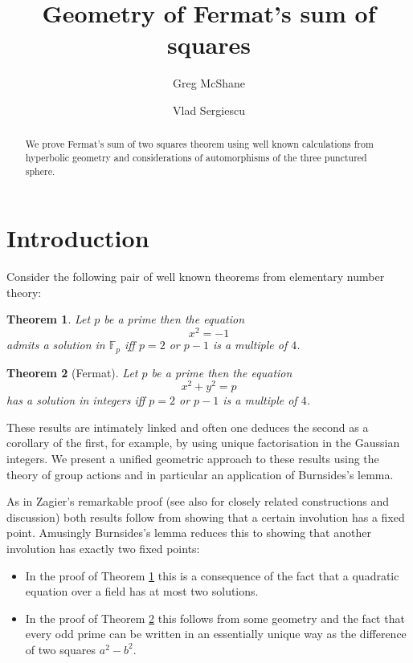 \documentclass[12pt,a4paper]{amsart}
\title{Geometry of Fermat's sum of squares}
\author[McShane]{Greg McShane}
\author[Sergiescu]{Vlad Sergiescu}
\newtheorem{thm}{Theorem}[section]
\def\fp{\mathbb{F}_p}
\begin{document}
\maketitle

\begin{abstract} 
We prove Fermat's sum  of two squares theorem 
using well known calculations from hyperbolic geometry 
and considerations of automorphisms of the three punctured sphere.
\end{abstract} 

\section{Introduction}


Consider the following pair of well known theorems from elementary number theory:

\begin{thm}\label{triv}
Let $p$ be a prime then the equation
$$x^2 = -1$$
admits a solution in $\fp$ iff 
$p=2$ or $p-1$ is a multiple of $4$.
\end{thm}


\begin{thm}[Fermat]\label{main}
Let $p$ be a prime then the equation
$$x^2 + y^2 = p $$
has a solution in integers  iff  $p=2$ or $p-1$ is a multiple of $4$.
\end{thm}

These results are intimately linked and often one deduces the second as a corollary of the first,
 for example, by using unique factorisation in the Gaussian integers.  We present a unified geometric  approach to these results  using the theory of group actions and in particular an application of Burnsides's lemma. 
 
 
As in Zagier's remarkable proof \cite{zagier} 
(see also \cite{heath,north,aigner2,elsholtz} for closely related constructions and discussion)
both results follow from showing that a certain involution has a fixed point. Amusingly Burnsides's lemma reduces this to showing that another involution has exactly two fixed points:
\begin{itemize}
\item  In the proof of Theorem \ref{triv} this is a consequence of the fact that a quadratic equation 
over a field has at most two solutions.
\item In the proof of Theorem \ref{main} this follows from some geometry and the fact that 
	every odd prime can be written in an essentially unique way
	as the difference of two squares $a^2 - b^2$.


 \end{itemize}
\end{document}
